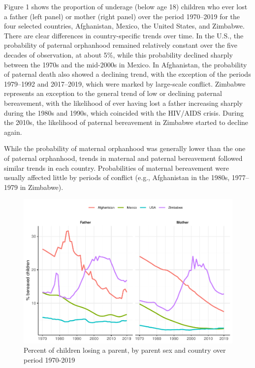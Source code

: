 \documentclass[
  11pt,
  letterpaper,
]{article}
\begin{document}
Figure 1 shows the proportion of underage (below age 18) children who ever lost a father (left panel) or mother (right panel) over the period 1970--2019 for the four selected countries, Afghanistan, Mexico, the United States, and Zimbabwe. There are clear differences in country-specific trends over time. In the U.S., the probability of paternal orphanhood remained relatively constant over the five decades of observation, at about 5\%, while this probability declined sharply between the 1970s and the mid-2000s in Mexico. In Afghanistan, the probability of paternal death also showed a declining trend, with the exception of the periods 1979--1992 and 2017--2019, which were marked by large-scale conflict. Zimbabwe represents an exception to the general trend of low or declining paternal bereavement, with the likelihood of ever having lost a father increasing sharply during the 1980s and 1990s, which coincided with the HIV/AIDS crisis. During the 2010s, the likelihood of paternal bereavement in Zimbabwe started to decline again.

While the probability of maternal orphanhood was generally lower than the one of paternal orphanhood, trends in maternal and paternal bereavement followed similar trends in each country. Probabilities of maternal bereavement were usually affected little by periods of conflict (e.g., Afghanistan in the 1980s, 1977--1979 in Zimbabwe).

\begin{figure}
\centering
\includegraphics{parental_loss_global_paa_ext_abstract_files/figure-latex/perc-ber-all-1.pdf}
\caption{\label{fig:perc-ber-all}Percent of children losing a parent, by parent sex and country over period 1970-2019}
\end{figure}
\end{document}
